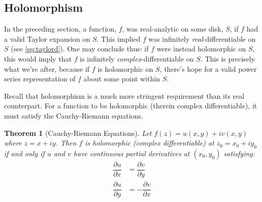 \documentclass[12pt,a4paper]{report}
\theoremstyle{thms}
\newtheorem{theorem}{Theorem}[section]
\theoremstyle{defns}
\begin{document}
\subsection{Holomorphism}
In the preceding section, a function, $f$, was real-analytic on some disk, $S$, if $f$ had a valid Taylor expansion on $S$. This implied $f$ was infinitely \textit{real}-differentiable on $S$ (see \eqref{eq:taylord}). One may conclude thus: if $f$ were instead holomorphic on $S$, this would imply that $f$ is infinitely \textit{complex}-differentiable on $S$. This is precisely what we're after, because if $f$ is holomorphic on $S$, there's hope for a valid power series representation of $f$ about some point within $S$.

Recall that holomorphism is a much more stringent requirement than its real counterpart. For a function to be holomorphic (therein complex differentiable), it must satisfy the Cauchy-Riemann equations.

\begin{theorem}[Cauchy-Riemann Equations]
    Let $f(z) = u(x, y) + iv(x, y)$ where $z = x + iy$. Then $f$ is holomorphic (complex differentiable) at $z_0 = x_0 + iy_0$ if and only if $u$ and $v$ have continuous partial derivatives at $(x_0, y_0)$ satisfying:
    \begin{align}
        \dfrac{\partial u}{\partial x} & = \dfrac{\partial v}{\partial y}  \\[6pt]
        \dfrac{\partial u}{\partial y} & = -\dfrac{\partial v}{\partial x}
    \end{align}
    \label{thm:cauchy_riemann}
\end{theorem}
\end{document}
